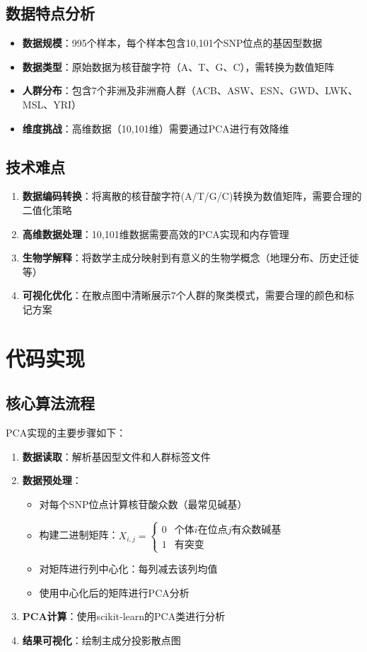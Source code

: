 \documentclass[a4paper]{article}
\begin{document}
\subsection{数据特点分析}
\begin{itemize}
    \item \textbf{数据规模}：995个样本，每个样本包含10,101个SNP位点的基因型数据
    \item \textbf{数据类型}：原始数据为核苷酸字符（A、T、G、C），需转换为数值矩阵
    \item \textbf{人群分布}：包含7个非洲及非洲裔人群（ACB、ASW、ESN、GWD、LWK、MSL、YRI）
    \item \textbf{维度挑战}：高维数据（10,101维）需要通过PCA进行有效降维
\end{itemize}

\subsection{技术难点}
\begin{enumerate}
    \item \textbf{数据编码转换}：将离散的核苷酸字符(A/T/G/C)转换为数值矩阵，需要合理的二值化策略
    \item \textbf{高维数据处理}：10,101维数据需要高效的PCA实现和内存管理
    \item \textbf{生物学解释}：将数学主成分映射到有意义的生物学概念（地理分布、历史迁徙等）
    \item \textbf{可视化优化}：在散点图中清晰展示7个人群的聚类模式，需要合理的颜色和标记方案
\end{enumerate}

\section{代码实现}

\subsection{核心算法流程}
PCA实现的主要步骤如下：

\begin{enumerate}
    \item \textbf{数据读取}：解析基因型文件和人群标签文件
    \item \textbf{数据预处理}：
    \begin{itemize}
        \item 对每个SNP位点计算核苷酸众数（最常见碱基）
        \item 构建二进制矩阵：$X_{i,j} = \begin{cases} 0 & \text{个体}i\text{在位点}j\text{有众数碱基} \\ 1 & \text{有突变} \end{cases}$
        \item 对矩阵进行列中心化：每列减去该列均值
        \item 使用中心化后的矩阵进行PCA分析
    \end{itemize}
    \item \textbf{PCA计算}：使用scikit-learn的PCA类进行分析
    \item \textbf{结果可视化}：绘制主成分投影散点图
\end{enumerate}
\end{document}
